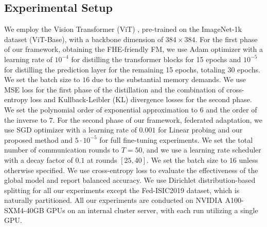\subsection{Experimental Setup}
We employ the Vision Transformer (ViT) \cite{dosovitskiy2020image}, pre-trained on the ImageNet-1k dataset \cite{russakovsky2015imagenet} (ViT-Base), with a backbone dimension of $384 \times 384$. For the first phase of our framework, obtaining the FHE-friendly FM, we use Adam optimizer with a learning rate of $10^{-4}$ for distilling the transformer blocks for 15 epochs and $10^{-5}$ for distilling the prediction layer for the remaining 15 epochs, totaling 30 epochs. We set the batch size to $16$ due to the substantial memory demands. We use MSE loss for the first phase of the distillation and the combination of cross-entropy loss and Kullback-Leibler (KL) divergence losses for the second phase. We set the polynomial order of exponential approximation to $6$ and the order of the inverse to $7$. 
For the second phase of our framework, federated adaptation, we use SGD optimizer with a learning rate of $0.001$ for Linear probing and our proposed method and $5\cdot10^{-5}$ for full fine-tuning experiments. We set the total number of communication rounds to $T=50$, and we use a learning rate scheduler with a decay factor of $0.1$ at rounds $[25, 40]$. We set the batch size to $16$ unless otherwise specified. We use cross-entropy loss to evaluate the effectiveness of the global model and report balanced accuracy. We use Dirichlet distribution-based splitting for all our experiments except the Fed-ISIC2019 dataset, which is naturally partitioned. 
All our experiments are conducted on NVIDIA A100-SXM4-40GB GPUs on an internal cluster server, with each run utilizing a single GPU. 


